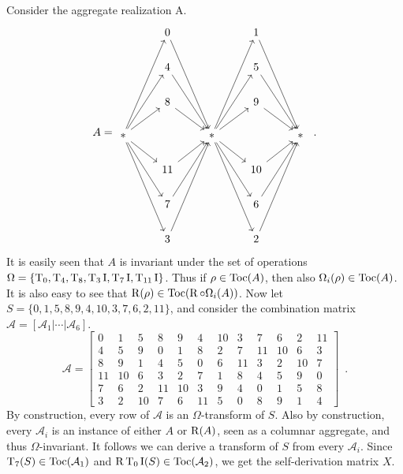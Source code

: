 \begin{example}
	\label{ex:stingray}
	Consider the aggregate realization A.
	\begin{equation}
		A = \begin{tikzcd}
			& 0 \arrow[dddr] && 1 \arrow[dddr] & \\
			& 4 \arrow[ddr] && 5 \arrow[ddr] & \\
			& 8 \arrow[dr] && 9 \arrow[dr] & \\
    		* \arrow[ur] \arrow[uur] \arrow[uuur] \arrow[dr] \arrow[ddr] \arrow[dddr] && * \arrow[ur] \arrow[uur] \arrow[uuur] \arrow[dr] \arrow[ddr] \arrow[dddr] && * \\
    		& 11 \arrow[ur] && 10 \arrow[ur] & \\
    		& 7 \arrow[uur] && 6 \arrow[uur] & \\
    		& 3 \arrow[uuur] && 2 \arrow[uuur] &
    	\end{tikzcd} \enspace.
	\end{equation}
	It is easily seen that $A$ is invariant under the set of operations $\Omega = \{ \operatorname{T}_0, \operatorname{T}_4, \operatorname{T}_8, \operatorname{T}_3\operatorname{I}, \operatorname{T}_7\operatorname{I}, \operatorname{T}_{11}\operatorname{I} \}$. Thus if $\rho \in \operatorname{Toc}(A)$, then also $\Omega_i(\rho) \in \operatorname{Toc}(A)$. It is also easy to see that $\operatorname{R}(\rho) \in \operatorname{Toc}(\operatorname{R} \circ \Omega_i(A))$. Now let $S = \{ 0, 1, 5, 8, 9, 4, 10, 3, 7, 6, 2, 11 \}$, and consider the combination matrix $\mathcal{A} = [\mathcal{A}_1 | \cdots | \mathcal{A}_6]$.
	\begin{equation}
    	\mathcal{A} = \left[
    	\begin{array}{cc|cc|cc|cc|cc|cc}
    		0 & 1 & 5 & 8 & 9 & 4 & 10 & 3 & 7 & 6 & 2 & 11 \\
    		4 & 5 & 9 & 0 & 1 & 8 & 2 & 7 & 11 & 10 & 6 & 3 \\
    		8 & 9 & 1 & 4 & 5 & 0 & 6 & 11 & 3 & 2 & 10 & 7 \\
    		11 & 10 & 6 & 3 & 2 & 7 & 1 & 8 & 4 & 5 & 9 & 0 \\
    		7 & 6 & 2 & 11 & 10 & 3 & 9 & 4 & 0 & 1 & 5 & 8 \\
    		3 & 2 & 10 & 7 & 6 & 11 & 5 & 0 & 8 & 9 & 1 & 4
    	\end{array}
    	\right] \enspace.
	\end{equation}
	By construction, every row of $\mathcal{A}$ is an $\Omega$-transform of $S$. Also by construction, every $\mathcal{A}_i$ is an instance of either $A$ or $\operatorname{R}(A)$, seen as a columnar aggregate, and thus $\Omega$-invariant. It follows we can derive a transform of $S$ from every $\mathcal{A}_i$. Since $\operatorname{T}_7(S) \in \operatorname{Toc}(\mathcal{A}_1)$ and $\operatorname{R}\operatorname{T}_0\operatorname{I}(S) \in \operatorname{Toc}(\mathcal{A}_2)$, we get the self-derivation matrix $X$.

\end{example}
